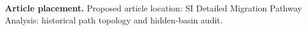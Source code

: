 \textbf{Article placement.} Proposed article location: SI Detailed Migration Pathway Analysis: historical path topology and hidden-basin audit.
